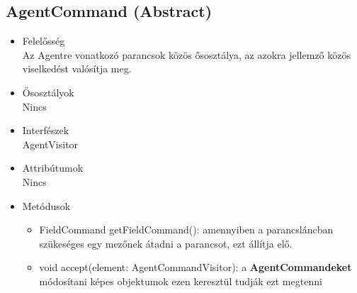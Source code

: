 \subsection{AgentCommand (Abstract)}
\begin{itemize}

\item Felelősség\\
Az Agentre vonatkozó parancsok közös ősosztálya, az azokra jellemző közös viselkedést valósítja meg.

\item Ősosztályok\\
Nincs

\item Interfészek\\
AgentVisitor

\item Attribútumok\\
Nincs

\item Metódusok\\

\begin{itemize}
    \item FieldCommand getFieldCommand(): amennyiben a parancsláncban szükeséges egy mezőnek átadni a parancsot, ezt állítja elő.
    \item void accept(element: AgentCommandVisitor): a \textbf{AgentCommandeket} módosítani képes objektumok ezen keresztül tudják ezt megtenni
\end{itemize}

\end{itemize}

